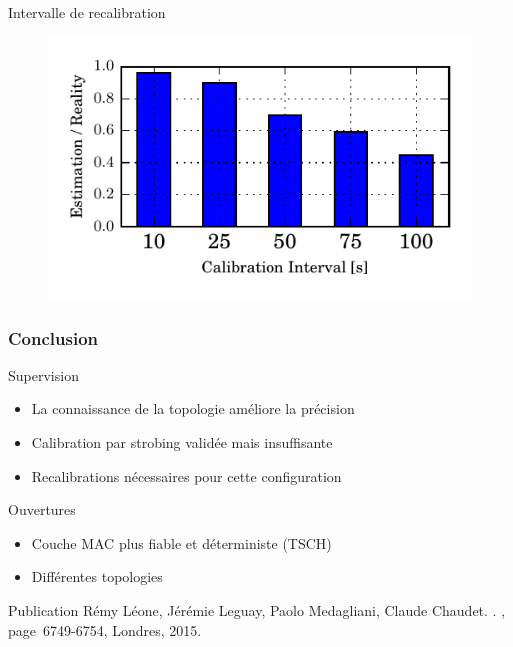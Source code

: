 \begin{frame}{Intervalle de recalibration}
  \begin{figure}[ht]
    \centering
    \includegraphics[width=\textwidth]{figures/ratio_recalibration.pdf}
  \end{figure}
\end{frame}

\begin{frame}\frametitle{Conclusion}

  \begin{block}{Supervision}
      \begin{itemize}
        \item La connaissance de la topologie améliore la précision
        \item Calibration par strobing validée mais insuffisante
        \item Recalibrations nécessaires pour cette configuration
      \end{itemize}
  \end{block}

  \begin{block}{Ouvertures}
    \begin{itemize}
      \item Couche MAC plus fiable et déterministe (TSCH)
      \item Différentes topologies
    \end{itemize}
  \end{block}


\end{frame}

\begin{frame}{Publication}
    Rémy Léone, Jérémie Leguay, Paolo Medagliani, Claude Chaudet.
    .
    , page~6749-6754, Londres, 2015.
\end{frame}
